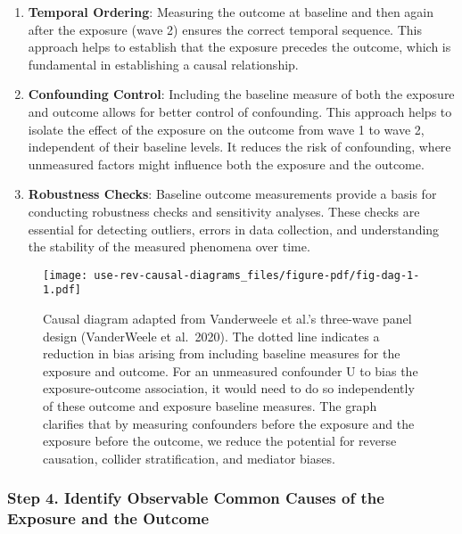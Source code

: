 \documentclass[
  singlecolumn,
  9pt]{article}
\begin{document}
\begin{enumerate}
\def\labelenumi{\arabic{enumi}.}
\item
  \textbf{Temporal Ordering}: Measuring the outcome at baseline and then
  again after the exposure (wave 2) ensures the correct temporal
  sequence. This approach helps to establish that the exposure precedes
  the outcome, which is fundamental in establishing a causal
  relationship.
\item
  \textbf{Confounding Control}: Including the baseline measure of both
  the exposure and outcome allows for better control of confounding.
  This approach helps to isolate the effect of the exposure on the
  outcome from wave 1 to wave 2, independent of their baseline levels.
  It reduces the risk of confounding, where unmeasured factors might
  influence both the exposure and the outcome.
\item
  \textbf{Robustness Checks}: Baseline outcome measurements provide a
  basis for conducting robustness checks and sensitivity analyses. These
  checks are essential for detecting outliers, errors in data
  collection, and understanding the stability of the measured phenomena
  over time.
\end{enumerate}

\begin{figure}

{\centering \texttt{[image: use-rev-causal-diagrams\_files/figure-pdf/fig-dag-1-1.pdf]}

}

\caption{\label{fig-dag-1}Causal diagram adapted from Vanderweele et
al.'s three-wave panel design (VanderWeele et al.~2020). The dotted line
indicates a reduction in bias arising from including baseline measures
for the exposure and outcome. For an unmeasured confounder U to bias the
exposure-outcome association, it would need to do so independently of
these outcome and exposure baseline measures. The graph clarifies that
by measuring confounders before the exposure and the exposure before the
outcome, we reduce the potential for reverse causation, collider
stratification, and mediator biases.}

\end{figure}

\subsubsection{Step 4. Identify Observable Common Causes of the Exposure
and the
Outcome}\label{step-4.-identify-observable-common-causes-of-the-exposure-and-the-outcome}
\end{document}
